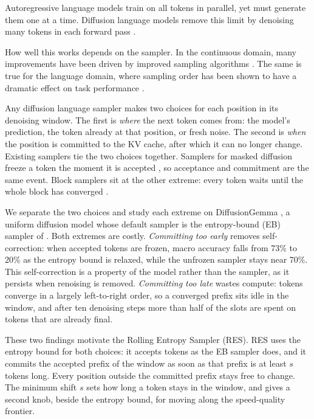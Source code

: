 Autoregressive language models train on all tokens in parallel, yet must generate them one at a time.
Diffusion language models remove this limit by denoising many tokens in each forward pass \citep{nie2026large, ye2025dream7bdiffusionlarge, team2026diffusiongemma}.

How well this works depends on the sampler.
In the continuous domain, many improvements have been driven by improved sampling algorithms \citep{song2020denoising}.
The same is true for the language domain, where sampling order has been shown to have a dramatic effect on task performance \citep{kim2025train, ben2026accelerated, kim2026klass}.

Any diffusion language sampler makes two choices for each position in its denoising window.
The first is \emph{where} the next token comes from: the model's prediction, the token already at that position, or fresh noise.
The second is \emph{when} the position is committed to the KV cache, after which it can no longer change.
Existing samplers tie the two choices together.
Samplers for masked diffusion freeze a token the moment it is accepted \citep{nie2026large, ben2026accelerated}, so acceptance and commitment are the same event.
Block samplers sit at the other extreme: every token waits until the whole block has converged \citep{arriola2025blockdiffusioninterpolatingautoregressive, team2026diffusiongemma}.

We separate the two choices and study each extreme on DiffusionGemma \citep{team2026diffusiongemma}, a uniform diffusion model whose default sampler is the entropy-bound (EB) sampler of \citet{ben2026accelerated}.
Both extremes are costly.
\emph{Committing too early} removes self-correction: when accepted tokens are frozen, macro accuracy falls from 73\% to 20\% as the entropy bound is relaxed, while the unfrozen sampler stays near 70\%.
This self-correction is a property of the model rather than the sampler, as it persists when renoising is removed.
\emph{Committing too late} wastes compute: tokens converge in a largely left-to-right order, so a converged prefix sits idle in the window, and after ten denoising steps more than half of the slots are spent on tokens that are already final.

These two findings motivate the Rolling Entropy Sampler (RES).
RES uses the entropy bound for both choices: it accepts tokens as the EB sampler does, and it commits the accepted prefix of the window as soon as that prefix is at least $s$ tokens long.
Every position outside the committed prefix stays free to change.
The minimum shift $s$ sets how long a token stays in the window, and gives a second knob, beside the entropy bound, for moving along the speed-quality frontier.

